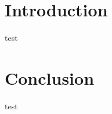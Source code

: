 \documentclass[a4j, 11pt, uplatex]{jsarticle}
\begin{document}
\maketoc

\section{Introduction}
test

\section{Conclusion}
test
\end{document}

